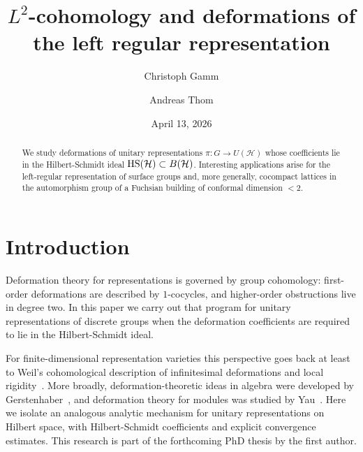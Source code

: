 \documentclass[12pt]{amsproc}
\title[$L^2$-cohomology and deformations]{$L^2$-cohomology and deformations of \\ the left regular representation}
\author{Christoph Gamm}
\author{Andreas Thom}
\date{April 13, 2026}
\theoremstyle{plain}
\theoremstyle{definition}
\numberwithin{equation}{section}
\newcommand{\HS}{{\rm HS}}
\newcommand{\BH}{B(\mathcal H)}
\begin{document}
\begin{abstract}
We study deformations of unitary representations $\pi\colon G\to U(\mathcal H)$ whose coefficients lie in the Hilbert-Schmidt ideal $\HS(\mathcal H)\subset \BH$. Interesting applications arise for the left-regular representation of surface groups and, more generally, cocompact lattices in the automorphism group of a Fuchsian building of conformal dimension $<2$.
\end{abstract}

\maketitle

\tableofcontents

\section{Introduction}
Deformation theory for representations is governed by group cohomology: first-order deformations are described by $1$-cocycles, and higher-order obstructions live in degree two. In this paper we carry out that program for unitary representations of discrete groups when the deformation coefficients are required to lie in the Hilbert-Schmidt ideal.

For finite-dimensional representation varieties this perspective goes back at least to Weil's cohomological description of infinitesimal deformations and local rigidity~\cite{Weil1964}. More broadly, deformation-theoretic ideas in algebra were developed by Gerstenhaber~\cite{Gerstenhaber1964}, and deformation theory for modules was studied by Yau~\cite{Yau2005}. Here we isolate an analogous analytic mechanism for unitary representations on Hilbert space, with Hilbert-Schmidt coefficients and explicit convergence estimates. This research is part of the forthcoming PhD thesis by the first author.

\medskip
\end{document}
